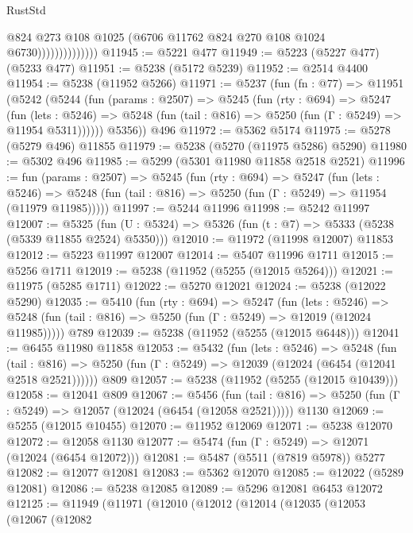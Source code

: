\begin{lexlean}{RustStd}
\begin{coremodule}
                              @824
                              @273
                              @108
                              @1025
                              (@6706 @11762 @824 @270 @108 @1024 @6730))))))))))))))
@11945 := @5221 @477
@11949 := @5223 (@5227 @477) (@5233 @477)
@11951 := @5238 (@5172 @5239)
@11952 := @2514 @4400
@11954 := @5238 (@11952 @5266)
@11971 := @5237
    (fun (fn : @77) =>
    @11951
      (@5242
        (@5244
          (fun (params : @2507) =>
          @5245
            (fun (rty : @694) =>
            @5247
              (fun (lets : @5246) =>
              @5248 (fun (tail : @816) => @5250 (fun (Γ : @5249) => @11954 @5311))))))
        @5356))
    @496
@11972 := @5362 @5174
@11975 := @5278 (@5279 @496) @11855
@11979 := @5238 (@5270 (@11975 @5286) @5290)
@11980 := @5302 @496
@11985 := @5299 (@5301 @11980 @11858 @2518 @2521)
@11996 := fun (params : @2507) =>
  @5245
    (fun (rty : @694) =>
    @5247
      (fun (lets : @5246) =>
      @5248 (fun (tail : @816) => @5250 (fun (Γ : @5249) => @11954 (@11979 @11985)))))
@11997 := @5244 @11996
@11998 := @5242 @11997
@12007 := @5325
    (fun (U : @5324) => @5326 (fun (t : @7) => @5333 (@5238 (@5339 @11855 @2524) @5350)))
@12010 := @11972 (@11998 @12007) @11853
@12012 := @5223 @11997 @12007
@12014 := @5407 @11996 @1711
@12015 := @5256 @1711
@12019 := @5238 (@11952 (@5255 (@12015 @5264)))
@12021 := @11975 (@5285 @1711)
@12022 := @5270 @12021
@12024 := @5238 (@12022 @5290)
@12035 := @5410
    (fun (rty : @694) =>
    @5247
      (fun (lets : @5246) =>
      @5248 (fun (tail : @816) => @5250 (fun (Γ : @5249) => @12019 (@12024 @11985)))))
    @789
@12039 := @5238 (@11952 (@5255 (@12015 @6448)))
@12041 := @6455 @11980 @11858
@12053 := @5432
    (fun (lets : @5246) =>
    @5248
      (fun (tail : @816) =>
      @5250 (fun (Γ : @5249) => @12039 (@12024 (@6454 (@12041 @2518 @2521))))))
    @809
@12057 := @5238 (@11952 (@5255 (@12015 @10439)))
@12058 := @12041 @809
@12067 := @5456
    (fun (tail : @816) => @5250 (fun (Γ : @5249) => @12057 (@12024 (@6454 (@12058 @2521)))))
    @1130
@12069 := @5255 (@12015 @10455)
@12070 := @11952 @12069
@12071 := @5238 @12070
@12072 := @12058 @1130
@12077 := @5474 (fun (Γ : @5249) => @12071 (@12024 (@6454 @12072)))
@12081 := @5487 (@5511 (@7819 @5978)) @5277
@12082 := @12077 @12081
@12083 := @5362 @12070
@12085 := @12022 (@5289 @12081)
@12086 := @5238 @12085
@12089 := @5296 @12081 @6453 @12072
@12125 := @11949
    (@11971
      (@12010
        (@12012
          (@12014
            (@12035
              (@12053
                (@12067
                  (@12082

\end{coremodule}
\end{lexlean}
